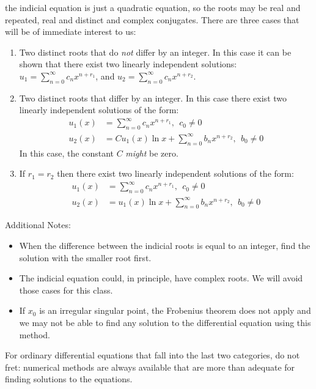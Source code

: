  the indicial equation is just a quadratic equation, so the roots may be real and repeated, real and distinct and complex conjugates.  There are three cases that will be of immediate interest to us:
\begin{enumerate}
\item Two distinct roots that do \emph{not} differ by an integer.  In this case it can be shown that there exist two linearly independent solutions: $u_1 = \sum_{n=0}^{\infty}c_nx^{n+r_1}$, and $u_2 = \sum_{n=0}^{\infty}c_nx^{n+r_2}$.
\item Two distinct roots that differ by an integer.  In this case there exist two linearly independent solutions of the form:
\begin{align*}
u_1(x) &= \sum\limits_{n=0}^{\infty}c_nx^{n+r_1}, \ \ c_0 \ne 0 \\
u_2(x) &= C u_1(x) \ln{x} + \sum\limits_{n=0}^{\infty}b_nx^{n+r_2}, \ \ b_0 \ne 0 
\end{align*}
In this case, the constant $C$ \emph{might} be zero.
\item If $r_1 = r_2$ then there exist two linearly independent solutions of the form:
\begin{align*}
u_1(x) &= \sum\limits_{n=0}^{\infty}c_nx^{n+r_1}, \ \ c_0 \ne 0 \\
u_2(x) &= u_1(x) \ln{x} + \sum\limits_{n=0}^{\infty}b_nx^{n+r_2}, \ \ b_0 \ne 0
\end{align*}
\end{enumerate}

\noindent Additional Notes:

\begin{itemize}
\item When the difference between the indicial roots is equal to an integer, find the solution with the smaller root first.

\item The indicial equation could, in principle, have complex roots.  We will avoid those cases for this class.

\item If $x_0$ is an irregular singular point, the Frobenius theorem does not apply and we may not be able to find any solution to the differential equation using this method.
\end{itemize}
For ordinary differential equations that fall into the last two categories, do not fret: numerical methods are always available that are more than adequate for finding solutions to the equations.
